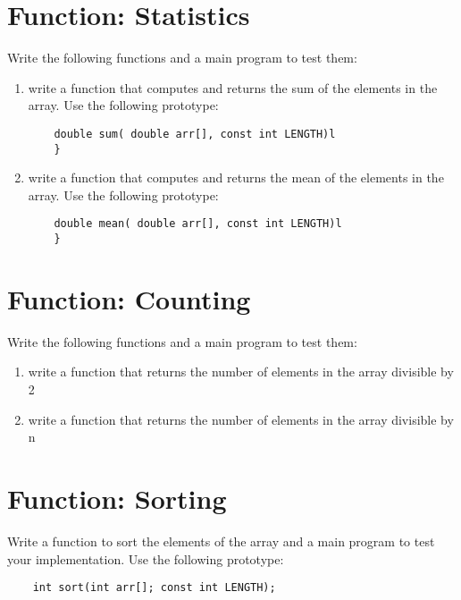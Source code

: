 \documentclass{article}
\begin{document}
\section*{Function: Statistics}
Write the following functions and a main program to test them:
\begin{enumerate}
	\item write a function that computes and returns the sum of the elements in the array. Use the following prototype:
	\begin{verbatim}
	double sum( double arr[], const int LENGTH)l
	}
	\end{verbatim}
	\item write a function that computes and returns the mean of the elements in the array. Use the following prototype:
	\begin{verbatim}
	double mean( double arr[], const int LENGTH)l
	}
	\end{verbatim}
\end{enumerate}

\section*{Function: Counting}
Write the following functions and a main program to test them:
\begin{enumerate}
	\item write a function that returns the number of elements in the array divisible by 2
	\item write a function that returns the number of elements in the array divisible by n
\end{enumerate}

\section*{Function: Sorting}
Write a function to sort the elements of the array and a main program to test your implementation. Use the following prototype:
\begin{verbatim}
	int sort(int arr[]; const int LENGTH);
\end{verbatim}
\end{document}
